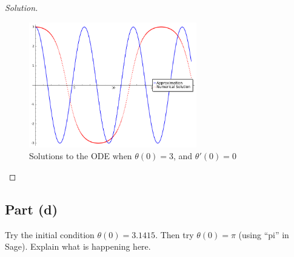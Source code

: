 \documentclass[letterpaper, 12pt]{amsart}
\theoremstyle{definition}  							%
\begin{document}
\begin{proof}[Solution]
			\begin{figure}[b]
				\includegraphics[width=0.65\textwidth]{images/theta3.png}
				\caption{Solutions to the ODE when $\theta(0)=3$, and $\theta'(0)=0$}
				\label{theta3}
			\end{figure}
		\end{proof}

		\subsection*{Part (d)}
		Try the initial condition $\theta(0) = 3.1415$. 
		Then try $\theta(0) = \pi$ (using ``pi'' in Sage). 
		Explain what is happening here.
\end{document}
